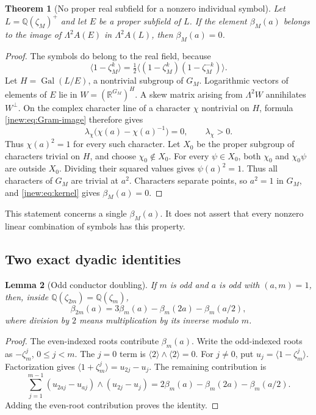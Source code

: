 \documentclass[11pt,a4paper]{article}
\newtheorem{theorem}{Theorem}[section]
\newtheorem{lemma}[theorem]{Lemma}
\theoremstyle{definition}
\theoremstyle{remark}
\numberwithin{equation}{section}
\begin{document}
\begin{theorem}[No proper real subfield for a nonzero individual symbol]
\label{jnew:thm:subfield}
Let $L=\mathbb Q(\zeta_M)^+$ and let $E$ be a proper subfield of $L$.
If the element $\beta_M(a)$ belongs to the image of
$\Lambda^2 A(E)$ in $\Lambda^2 A(L)$, then $\beta_M(a)=0$.
\end{theorem}
\begin{proof}
The symbols do belong to the real field, because
\[
 \langle1-\zeta_M^k\rangle
 =\tfrac12\langle(1-\zeta_M^k)(1-\zeta_M^{-k})\rangle.
\]
Let $H=\operatorname{Gal}(L/E)$, a nontrivial subgroup of $G_M$.
Logarithmic vectors of elements of $E$ lie in
$W=(\mathbb R^{G_M})^H$. A skew matrix arising from
$\Lambda^2 W$ annihilates $W^\perp$. On the complex character line
of a character $\chi$ nontrivial on $H$, formula
\eqref{jnew:eq:Gram-image} therefore gives
\[
 \lambda_\chi\bigl(\chi(a)-\chi(a)^{-1}\bigr)=0,
 \qquad\lambda_\chi>0.
\]
Thus $\chi(a)^2=1$ for every such character. Let $X_0$ be the
proper subgroup of characters trivial on $H$, and choose
$\chi_0\notin X_0$. For every $\psi\in X_0$, both $\chi_0$ and
$\chi_0\psi$ are outside $X_0$. Dividing their squared values gives
$\psi(a)^2=1$. Thus all characters of $G_M$ are trivial at $a^2$.
Characters separate points, so $a^2=1$ in $G_M$, and
\eqref{jnew:eq:kernel} gives $\beta_M(a)=0$.
\end{proof}

This statement concerns a single $\beta_M(a)$. It does not assert
that every nonzero linear combination of symbols has this property.

\subsection{Two exact dyadic identities}

\begin{lemma}[Odd conductor doubling]\label{jnew:lem:odd-double}
If $m$ is odd and $a$ is odd with $(a,m)=1$, then, inside
$\mathbb Q(\zeta_{2m})=\mathbb Q(\zeta_m)$,
\begin{equation}\label{jnew:eq:odd-double}
 \beta_{2m}(a)=3\beta_m(a)-\beta_m(2a)-\beta_m(a/2),
\end{equation}
where division by $2$ means multiplication by its inverse modulo $m$.
\end{lemma}
\begin{proof}
The even-indexed roots contribute $\beta_m(a)$. Write the odd-indexed
roots as $-\zeta_m^j$, $0\le j<m$. The $j=0$ term is
$\langle2\rangle\wedge\langle2\rangle=0$.
For $j\ne0$, put $u_j=\langle1-\zeta_m^j\rangle$. Factorization gives
$\langle1+\zeta_m^j\rangle=u_{2j}-u_j$. The remaining contribution is
\[
 \sum_{j=1}^{m-1}(u_{2aj}-u_{aj})\wedge(u_{2j}-u_j)
 =2\beta_m(a)-\beta_m(2a)-\beta_m(a/2).
\]
Adding the even-root contribution proves the identity.
\end{proof}
\end{document}
